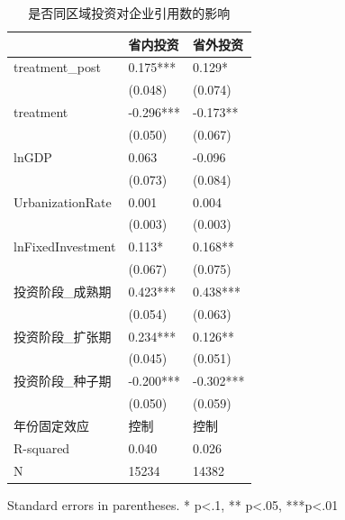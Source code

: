 \begin{table}
\caption{是否同区域投资对企业引用数的影响}
\label{}
\begin{center}
\begin{tabular}{lll}
\hline
                  & 省内投资      & 省外投资       \\
\hline
treatment\_post   & 0.175***  & 0.129*     \\
                  & (0.048)   & (0.074)    \\
treatment         & -0.296*** & -0.173**   \\
                  & (0.050)   & (0.067)    \\
lnGDP             & 0.063     & -0.096     \\
                  & (0.073)   & (0.084)    \\
UrbanizationRate              & 0.001     & 0.004      \\
                  & (0.003)   & (0.003)    \\
lnFixedInvestment & 0.113*    & 0.168**    \\
                  & (0.067)   & (0.075)    \\
投资阶段\_成熟期         & 0.423***  & 0.438***   \\
                  & (0.054)   & (0.063)    \\
投资阶段\_扩张期         & 0.234***  & 0.126**    \\
                  & (0.045)   & (0.051)    \\
投资阶段\_种子期         & -0.200*** & -0.302***  \\
                  & (0.050)   & (0.059)    \\
年份固定效应  & 控制 & 控制\\ 
\hline

R-squared         & 0.040     & 0.026      \\
N                 & 15234     & 14382      \\
\hline
\end{tabular}
\end{center}
\end{table}
\bigskip
Standard errors in parentheses. \newline 
* p<.1, ** p<.05, ***p<.01

